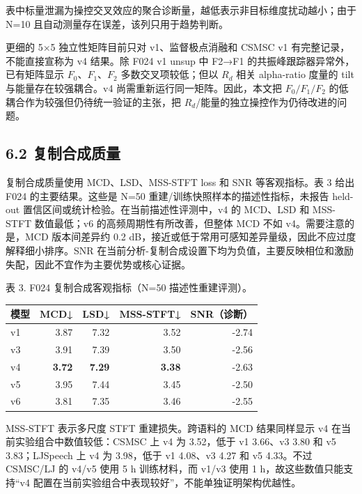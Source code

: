 表中标量泄漏为操控交叉效应的聚合诊断量，越低表示非目标维度扰动越小；由于
N=10 且自动测量存在误差，该列只用于趋势判断。

更细的 5×5 独立性矩阵目前只对 v1、监督极点消融和 CSMSC v1
有完整记录，不能直接宣称为 v4 结果。除 F024 v1 unsup 中 F2→F1
的共振峰跟踪器异常外，已有矩阵显示 \(F_0\)、\(F_1\)、\(F_2\)
多数交叉项较低；但以 \(R_d\) 相关 alpha-ratio 度量的 tilt
与能量存在较强耦合。v4 尚需重新运行同一矩阵。因此，本文把
\(F_0/F_1/F_2\) 的低耦合作为较强但仍待统一验证的主张，把
\(R_d\)/能量的独立操控作为仍待改进的问题。

\subsection{6.2
复制合成质量}\label{ux590dux5236ux5408ux6210ux8d28ux91cf}

复制合成质量使用 MCD、LSD、MSS-STFT loss 和 SNR 等客观指标。表 3 给出
F024 的主要结果。这些是 N=50 重建/训练快照样本的描述性指标，未报告
held-out 置信区间或统计检验。在当前描述性评测中，v4 的 MCD、LSD 和
MSS-STFT 数值最低；v6 的高频周期性有所改善，但整体 MCD 不如
v4。需要注意的是，MCD 版本间差异约 0.2
dB，接近或低于常用可感知差异量级，因此不应过度解释细小排序。SNR
在当前分析-复制合成设置下均为负值，主要反映相位和激励失配，因此不宜作为主要优势或核心证据。

表 3. F024 复制合成客观指标（N=50 描述性重建评测）。

{\def\LTcaptype{none} %
\begin{longtable}[]{@{}lrrrr@{}}
\toprule\noalign{}
模型 & MCD↓ & LSD↓ & MSS-STFT↓ & SNR（诊断） \\
\midrule\noalign{}
\endhead
\bottomrule\noalign{}
\endlastfoot
v1 & 3.87 & 7.32 & 3.52 & -2.74 \\
v3 & 3.91 & 7.39 & 3.50 & -2.56 \\
v4 & \textbf{3.72} & \textbf{7.29} & \textbf{3.38} & -2.63 \\
v5 & 3.95 & 7.44 & 3.45 & -2.50 \\
v6 & 3.81 & 7.35 & 3.46 & -2.55 \\
\end{longtable}
}

MSS-STFT 表示多尺度 STFT 重建损失。跨语料的 MCD 结果同样显示 v4
在当前实验组合中数值较低：CSMSC 上 v4 为 3.52，低于 v1 3.66、v3 3.80 和
v5 3.83；LJSpeech 上 v4 为 3.98，低于 v1 4.08、v3 4.27 和 v5 4.33。不过
CSMSC/LJ 的 v4/v5 使用 5 h 训练材料，而 v1/v3 使用 1
h，故这些数值只能支持``v4
配置在当前实验组合中表现较好''，不能单独证明架构优越性。

